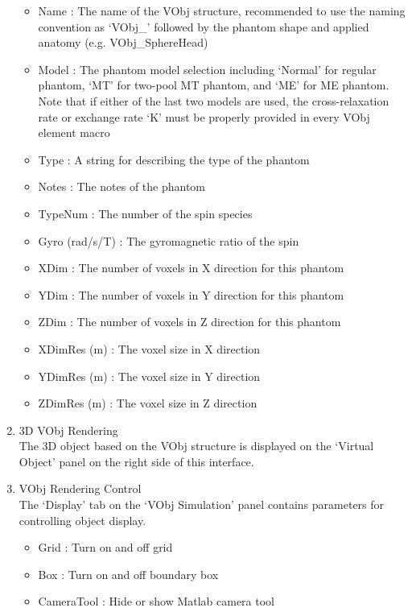 \documentclass{book}%
\begin{document}
\begin{enumerate}
\begin{itemize}
	\item Name : The name of the VObj structure, recommended to use the naming convention as `VObj\_' followed by the phantom shape and applied anatomy (e.g. VObj\_SphereHead)
	\item Model : The phantom model selection including `Normal' for regular phantom, `MT' for two-pool MT phantom, and `ME' for ME phantom. Note that if either of the last two models are used, the cross-relaxation rate or exchange rate `K' must be properly provided in every VObj element macro
	\item Type : A string for describing the type of the phantom
	\item Notes :  The notes of the phantom
	\item TypeNum : The number of the spin species
	\item Gyro (rad/s/T) : The gyromagnetic ratio of the spin
	\item XDim : The number of voxels in X direction for this phantom
	\item YDim : The number of voxels in Y direction for this phantom
	\item ZDim : The number of voxels in Z direction for this phantom
	\item XDimRes (m) : The voxel size in X direction
	\item YDimRes (m) : The voxel size in Y direction
	\item ZDimRes (m) : The voxel size in Z direction
\end{itemize}

	\item 3D VObj Rendering\\
The 3D object based on the VObj structure is displayed on the `Virtual Object' panel on the right side of this interface.

	\item VObj Rendering Control \\
The `Display' tab on the `VObj Simulation' panel contains parameters for controlling object display.

\begin{itemize}
	\item Grid : Turn on and off grid
	\item Box : Turn on and off boundary box
	\item CameraTool : Hide or show Matlab camera tool
\end{itemize}	

\end{enumerate}
\end{document}

